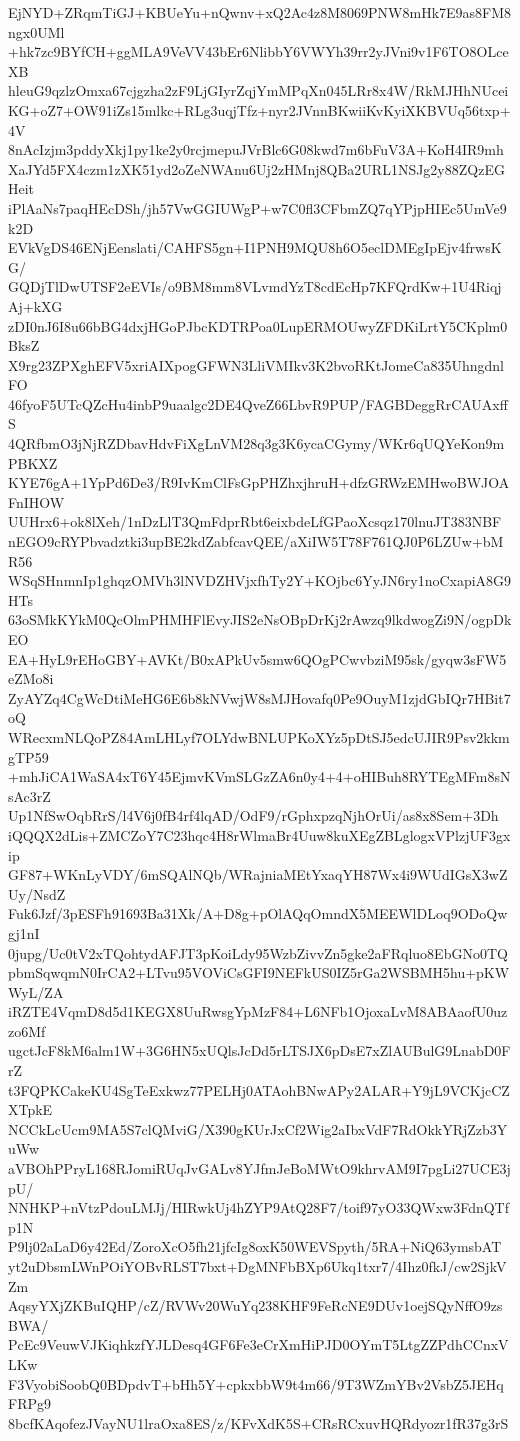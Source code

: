 EjNYD+ZRqmTiGJ+KBUeYu+nQwnv+xQ2Ac4z8M8069PNW8mHk7E9as8FM8ngx0UMl
+hk7zc9BYfCH+ggMLA9VeVV43bEr6NlibbY6VWYh39rr2yJVni9v1F6TO8OLceXB
hleuG9qzlzOmxa67cjgzha2zF9LjGIyrZqjYmMPqXn045LRr8x4W/RkMJHhNUcei
KG+oZ7+OW91iZs15mlkc+RLg3uqjTfz+nyr2JVnnBKwiiKvKyiXKBVUq56txp+4V
8nAcIzjm3pddyXkj1py1ke2y0rcjmepuJVrBlc6G08kwd7m6bFuV3A+KoH4IR9mh
XaJYd5FX4czm1zXK51yd2oZeNWAnu6Uj2zHMnj8QBa2URL1NSJg2y88ZQzEGHeit
iPlAaNs7paqHEcDSh/jh57VwGGIUWgP+w7C0fl3CFbmZQ7qYPjpHIEc5UmVe9k2D
EVkVgDS46ENjEenslati/CAHFS5gn+I1PNH9MQU8h6O5eclDMEgIpEjv4frwsKG/
GQDjTlDwUTSF2eEVIs/o9BM8mm8VLvmdYzT8cdEcHp7KFQrdKw+1U4RiqjAj+kXG
zDI0nJ6I8u66bBG4dxjHGoPJbcKDTRPoa0LupERMOUwyZFDKiLrtY5CKplm0BksZ
X9rg23ZPXghEFV5xriAIXpogGFWN3LliVMIkv3K2bvoRKtJomeCa835UhngdnlFO
46fyoF5UTcQZcHu4inbP9uaalgc2DE4QveZ66LbvR9PUP/FAGBDeggRrCAUAxffS
4QRfbmO3jNjRZDbavHdvFiXgLnVM28q3g3K6ycaCGymy/WKr6qUQYeKon9mPBKXZ
KYE76gA+1YpPd6De3/R9IvKmClFsGpPHZhxjhruH+dfzGRWzEMHwoBWJOAFnIHOW
UUHrx6+ok8lXeh/1nDzLlT3QmFdprRbt6eixbdeLfGPaoXcsqz170lnuJT383NBF
nEGO9cRYPbvadztki3upBE2kdZabfcavQEE/aXiIW5T78F761QJ0P6LZUw+bMR56
WSqSHnmnIp1ghqzOMVh3lNVDZHVjxfhTy2Y+KOjbc6YyJN6ry1noCxapiA8G9HTs
63oSMkKYkM0QcOlmPHMHFlEvyJIS2eNsOBpDrKj2rAwzq9lkdwogZi9N/ogpDkEO
EA+HyL9rEHoGBY+AVKt/B0xAPkUv5smw6QOgPCwvbziM95sk/gyqw3sFW5eZMo8i
ZyAYZq4CgWcDtiMeHG6E6b8kNVwjW8sMJHovafq0Pe9OuyM1zjdGbIQr7HBit7oQ
WRecxmNLQoPZ84AmLHLyf7OLYdwBNLUPKoXYz5pDtSJ5edcUJIR9Psv2kkmgTP59
+mhJiCA1WaSA4xT6Y45EjmvKVmSLGzZA6n0y4+4+oHIBuh8RYTEgMFm8sNsAc3rZ
Up1NfSwOqbRrS/l4V6j0fB4rf4lqAD/OdF9/rGphxpzqNjhOrUi/as8x8Sem+3Dh
iQQQX2dLis+ZMCZoY7C23hqc4H8rWlmaBr4Uuw8kuXEgZBLglogxVPlzjUF3gxip
GF87+WKnLyVDY/6mSQAlNQb/WRajniaMEtYxaqYH87Wx4i9WUdIGsX3wZUy/NsdZ
Fuk6Jzf/3pESFh91693Ba31Xk/A+D8g+pOlAQqOmndX5MEEWlDLoq9ODoQwgj1nI
0jupg/Uc0tV2xTQohtydAFJT3pKoiLdy95WzbZivvZn5gke2aFRqluo8EbGNo0TQ
pbmSqwqmN0IrCA2+LTvu95VOViCsGFI9NEFkUS0IZ5rGa2WSBMH5hu+pKWWyL/ZA
iRZTE4VqmD8d5d1KEGX8UuRwsgYpMzF84+L6NFb1OjoxaLvM8ABAaofU0uzzo6Mf
ugctJcF8kM6alm1W+3G6HN5xUQlsJcDd5rLTSJX6pDsE7xZlAUBulG9LnabD0FrZ
t3FQPKCakeKU4SgTeExkwz77PELHj0ATAohBNwAPy2ALAR+Y9jL9VCKjcCZXTpkE
NCCkLcUcm9MA5S7clQMviG/X390gKUrJxCf2Wig2aIbxVdF7RdOkkYRjZzb3YuWw
aVBOhPPryL168RJomiRUqJvGALv8YJfmJeBoMWtO9khrvAM9I7pgLi27UCE3jpU/
NNHKP+nVtzPdouLMJj/HIRwkUj4hZYP9AtQ28F7/toif97yO33QWxw3FdnQTfp1N
P9lj02aLaD6y42Ed/ZoroXcO5fh21jfcIg8oxK50WEVSpyth/5RA+NiQ63ymsbAT
yt2uDbsmLWnPOiYOBvRLST7bxt+DgMNFbBXp6Ukq1txr7/4Ihz0fkJ/cw2SjkVZm
AqsyYXjZKBuIQHP/cZ/RVWv20WuYq238KHF9FeRcNE9DUv1oejSQyNffO9zsBWA/
PcEc9VeuwVJKiqhkzfYJLDesq4GF6Fe3eCrXmHiPJD0OYmT5LtgZZPdhCCnxVLKw
F3VyobiSoobQ0BDpdvT+bHh5Y+cpkxbbW9t4m66/9T3WZmYBv2VsbZ5JEHqFRPg9
8bcfKAqofezJVayNU1lraOxa8ES/z/KFvXdK5S+CRsRCxuvHQRdyozr1fR37g3rS
